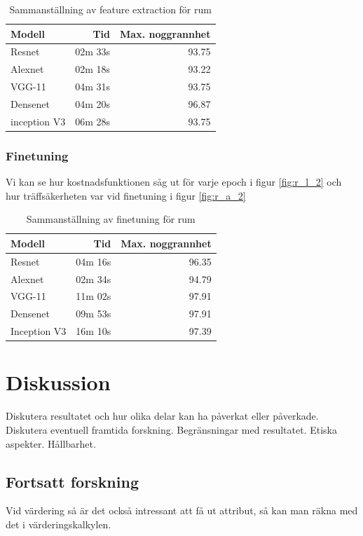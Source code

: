 \documentclass[]{kththesis}
\begin{document}
\begin{table}[!htbp]
  \centering
  \begin{tabular}{|l|r|r|}
    Modell & Tid & Max. noggrannhet \\ 
    \hline
    Resnet       & 02m 33s & 93.75 \\
    Alexnet      & 02m 18s & 93.22 \\
    VGG-11       & 04m 31s & 93.75 \\
    Densenet     & 04m 20s & 96.87 \\
    inception V3 & 06m 28s & 93.75 \\
  \end{tabular}
  \caption{Sammanställning av feature extraction för rum}
\end{table}



\subsection{Finetuning}
Vi kan se hur kostnadsfunktionen såg ut för varje epoch i figur \ref{fig:r_l_2} och hur träffsäkerheten var vid finetuning i figur \ref{fig:r_a_2}

\begin{table}
  \centering
  \begin{tabular}{|l|r|r|}
    Modell & Tid & Max. noggrannhet \\ 
    \hline
    Resnet       & 04m 16s & 96.35 \\
    Alexnet      & 02m 34s & 94.79 \\
    VGG-11       & 11m 02s & 97.91 \\
    Densenet     & 09m 53s & 97.91 \\
    Inception V3 & 16m 10s & 97.39 \\
  \end{tabular}
  \caption{Sammanställning av finetuning för rum}
\end{table}



\chapter{Diskussion}
Diskutera resultatet och hur olika delar kan ha påverkat eller påverkade. Diskutera eventuell framtida forskning. Begränsningar med resultatet. Etiska aspekter. Hållbarhet.

\section{Fortsatt forskning}
Vid värdering så är det också intressant att få ut attribut, så kan man räkna med det i värderingskalkylen.
\end{document}
